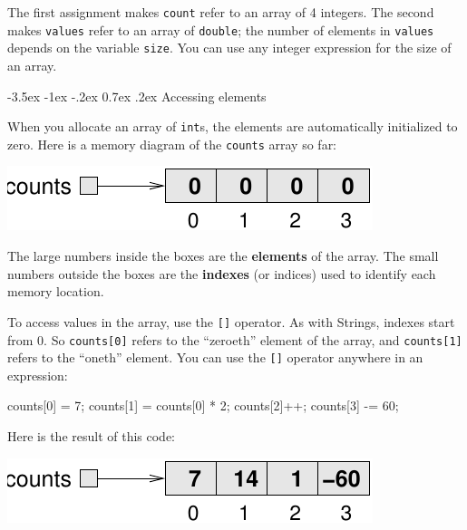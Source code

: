 \documentclass[12pt]{book}
\makeatletter
\theoremstyle{exercise}
\newcommand{\java}[1]{\verb"#1"}
\renewcommand{\section}{\@startsection{section}{1}{\z@}%
    {-3.5ex \@plus -1ex \@minus -.2ex}%
    {0.7ex \@plus.2ex}%
    {\normalfont\Large\bfseries}}
\newcommand{\java}[1]{\lstinline{#1}} %
\makeatother
\begin{document}
The first assignment makes \java{count} refer to an array of 4 integers.
The second makes \java{values} refer to an array of \java{double}; the number of elements in \java{values} depends on the variable \java{size}.
You can use any integer expression for the size of an array.


\section{Accessing elements}


When you allocate an array of \java{int}s, the elements are automatically initialized to zero.
Here is a memory diagram of the \java{counts} array so far:

\begin{center}
\includegraphics{figs/array.pdf}
\end{center}


The large numbers inside the boxes are the {\bf elements} of the array.
The small numbers outside the boxes are the {\bf indexes} (or indices) used to identify each memory location.

To access values in the array, use the \java{[]} operator.
As with Strings, indexes start from 0.
So \java{counts[0]} refers to the ``zeroeth'' element of the array, and \java{counts[1]} refers to the ``oneth'' element.
You can use the \java{[]} operator anywhere in an expression:

\begin{code}
    counts[0] = 7;
    counts[1] = counts[0] * 2;
    counts[2]++;
    counts[3] -= 60;
\end{code}

Here is the result of this code:

\begin{center}
\includegraphics{figs/array2.pdf}
\end{center}
\end{document}

